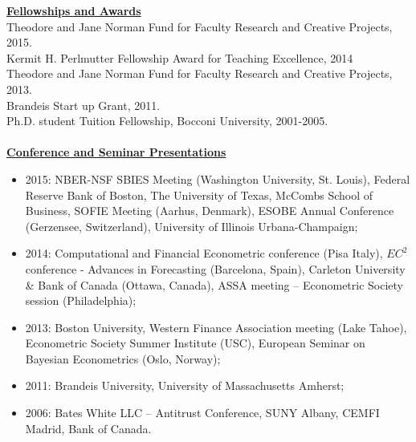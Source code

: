 \documentclass[12pt]{article}
\begin{document}
\underline{\textbf{Fellowships and Awards}}\\
Theodore and Jane Norman Fund for Faculty Research and Creative Projects, 2015. \\
Kermit H. Perlmutter Fellowship Award for Teaching Excellence, 2014 \\
Theodore and Jane Norman Fund for Faculty Research and Creative Projects, 2013. \\
Brandeis Start up Grant, 2011. \\
Ph.D. student Tuition Fellowship, Bocconi University, 2001-2005.\\ \\
\underline{\textbf{Conference and Seminar Presentations}}
\begin{itemize}
  \item 2015: NBER-NSF SBIES Meeting (Washington University, St. Louis), Federal Reserve Bank of Boston, The University of Texas, McCombs School of Business, SOFIE Meeting (Aarhus, Denmark), ESOBE Annual Conference (Gerzensee, Switzerland), University of Illinois Urbana-Champaign;
	\item 2014: Computational and Financial Econometric conference (Pisa Italy), $EC^2$ conference - Advances in Forecasting (Barcelona, Spain),  Carleton University & Bank of Canada (Ottawa, Canada), ASSA meeting -- Econometric Society session (Philadelphia);  
	\item 2013: Boston University, Western Finance Association meeting (Lake Tahoe), Econometric Society Summer Institute (USC), European Seminar on Bayesian Econometrics (Oslo, Norway); 
	\item 2011: Brandeis University, University of Massachusetts Amherst; 
	\item 2006: Bates White LLC -- Antitrust Conference, SUNY Albany, CEMFI Madrid, Bank of Canada.
\end{itemize}
\end{document}
